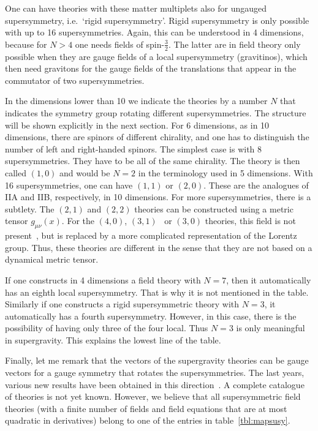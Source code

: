 \documentclass[a4paper,11pt,twoside]{article}
\newcommand{\ft}[2]{{\textstyle\frac{#1}{#2}}}
\begin{document}
One can have theories with these matter multiplets also for ungauged
supersymmetry, i.e.\ `rigid supersymmetry'. Rigid supersymmetry is only
possible with up to 16 supersymmetries. Again, this can be understood in
4 dimensions, because for $N>4$ one needs fields of spin-$\ft32$. The
latter are in field theory only possible when they are gauge fields of a
local supersymmetry (gravitinos), which then need gravitons for the gauge
fields of the translations that appear in the commutator of two
supersymmetries.

In the dimensions lower than 10 we indicate the theories by a number $N$
that indicates the symmetry group rotating different supersymmetries. The
structure will be shown explicitly in the next section. For 6 dimensions,
as in 10 dimensions, there are spinors of different chirality, and one
has to distinguish the number of left and right-handed spinors. The
simplest case is with 8 supersymmetries. They have to be all of the same
chirality. The theory is then called $(1,0)$ and would be $N=2$ in the
terminology used in 5 dimensions. With 16 supersymmetries, one can have
$(1,1)$ or $(2,0)$. These are the analogues of IIA and IIB, respectively,
in 10 dimensions. For more supersymmetries, there is a subtlety. The
$(2,1)$ and $(2,2)$ theories can be constructed using a metric tensor
$g_{\mu \nu }(x)$. For the $(4,0)$, $(3,1)$~\cite{Townsend:1984xt} or
$(3,0)$ theories, this field is not present~\cite{Hull:2000zn}, but is
replaced by a more complicated representation of the Lorentz group. Thus,
these theories are different in the sense that they are not based on a
dynamical metric tensor.

If one constructs in 4 dimensions a field theory with $N=7$, then it
automatically has an eighth local supersymmetry. That is why it is not
mentioned in the table. Similarly if one constructs a rigid
supersymmetric theory with $N=3$, it automatically has a fourth
supersymmetry. However, in this case, there is the possibility of having
only three of the four local. Thus $N=3$ is only meaningful in
supergravity. This explains the lowest line of the table.

Finally, let me remark that the vectors of the supergravity theories can
be gauge vectors for a gauge symmetry that rotates the supersymmetries.
The last years, various new results have been obtained in this
direction~\cite{Gheerardyn:2001jj,Hull:2002wg,Bergshoeff:2002mb,%
Andrianopoli:2002mf,Hull:2002cv,Bergshoeff:2002nv,Alonso-Alberca:2002tb,%
deWit:2002vt}. A complete catalogue of theories is not yet known.
However, we believe that all supersymmetric field theories (with a finite
number of fields and field equations that are at most quadratic in
derivatives) belong to one of the entries in table~\ref{tbl:mapsusy}.
\end{document}
